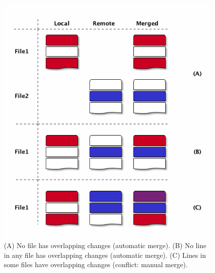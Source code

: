\documentclass[11pt]{article}
\begin{document}
\begin{figure}[htb]
\centering
\includegraphics[width=.9\linewidth]{./images/resolving-conflicts.png}
\caption{\label{fig:orgparagraph9}
(A) No file has overlapping changes (automatic merge). (B) No line in any file has overlapping changes (automatic merge). (C) Lines in some files have overlapping changes (conflict: manual merge).}
\end{figure}
\end{document}
